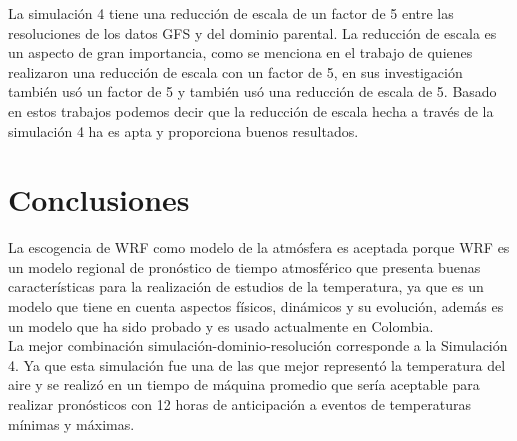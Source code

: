 La simulación 4 tiene una reducción de escala de un factor de 5 entre las resoluciones de los datos GFS y del dominio parental. La reducción de escala es un aspecto de gran importancia, como se menciona en el trabajo de \citet{Corrales2015} quienes realizaron una reducción de escala con un factor de 5, \citet{Parra2012} en sus investigación también usó un factor de 5 y \citep{ArmentaPorras2013} también usó una reducción de escala de 5.  Basado en estos trabajos podemos decir que la reducción de escala hecha a través de la simulación 4 ha es apta y proporciona buenos resultados.\\




\section{Conclusiones}

La escogencia de WRF como modelo de la atmósfera es aceptada porque WRF es un modelo regional de pronóstico de tiempo atmosférico que presenta buenas características para la realización de estudios de la temperatura, ya que es un modelo que tiene en cuenta aspectos físicos, dinámicos y su evolución, además es un modelo que ha sido probado y es usado actualmente en Colombia.\\

La mejor combinación simulación-dominio-resolución corresponde a la Simulación 4. Ya que esta simulación fue una de las que mejor representó la temperatura del aire  y se realizó en un tiempo de máquina promedio que sería aceptable para realizar pronósticos con 12 horas de anticipación a eventos de temperaturas mínimas y máximas.\\


